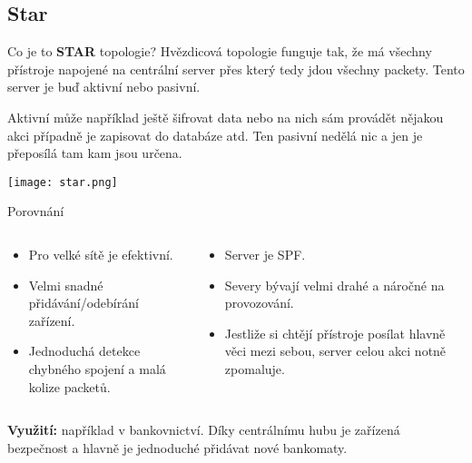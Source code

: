 \documentclass{beamer}
\begin{document}
\subsection{Star}
\label{sec:star}
\begin{frame}{Co je to \textbf{STAR} topologie?}
 Hvězdicová topologie funguje tak, že má všechny přístroje napojené na centrální
 server přes který tedy jdou všechny packety. Tento server je buď aktivní nebo
 pasivní.

 Aktivní může například ještě šifrovat data nebo na nich sám provádět nějakou
 akci případně je zapisovat do databáze atd. Ten pasivní nedělá nic a jen je
 přeposílá tam kam jsou určena.

 \texttt{[image: star.png]}
\end{frame}

\begin{frame}{Porovnání}

\begin{columns}
    \begin{column}{0.45\textwidth}
        \begin{itemize}
         \item Pro velké sítě je efektivní.
         \item Velmi snadné přidávání/odebírání zařízení.
         \item Jednoduchá detekce chybného spojení a malá kolize packetů.

        \end{itemize}
    \end{column}
    \begin{column}{0.45\textwidth}  %
        \begin{itemize}
            \item  Server je SPF. 
            \item Severy bývají velmi drahé a náročné na provozování.
            \item Jestliže si chtějí přístroje posílat hlavně věci mezi sebou,
             server celou akci notně zpomaluje.

        \end{itemize}
    \end{column}
    \end{columns}
    \vspace{10pt}

\textbf{Využití:} například v bankovnictví. Díky centrálnímu hubu je zařízená
bezpečnost a hlavně je jednoduché přidávat nové bankomaty. 
\end{frame}
\end{document}
